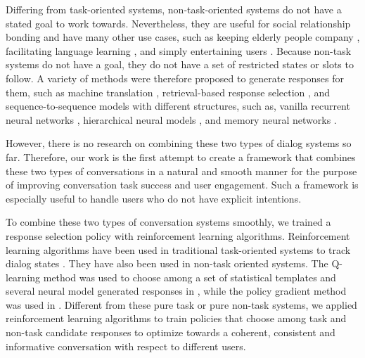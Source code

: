 \documentclass[11pt]{article}
\begin{document}
Differing from task-oriented systems, non-task-oriented systems do not have a stated goal to work towards. Nevertheless, they are useful for social relationship bonding and have many other use cases, such as keeping elderly people company \cite{higashinaka2014towards}, facilitating language learning \cite{jia2008use}, and simply entertaining users \cite{yu2016sigdialeng}. Because non-task systems do not have a goal, they do not have a set of restricted states or slots to follow. A variety of methods were therefore proposed to generate responses for them, such as machine translation \cite{ritter2011data}, retrieval-based response selection \cite{banchs2012iris}, and sequence-to-sequence models with different structures, such as, vanilla recurrent neural networks \cite{google}, hierarchical neural models \cite{serban2015building}, and memory neural networks \cite{dodge2015evaluating}.

However, there is no research on combining these two types of dialog systems so far. Therefore, our work is the first attempt to create a framework that combines these two types of conversations in a natural and smooth manner for the purpose of improving conversation task success and user engagement. Such a framework is especially useful to handle users who do not have explicit intentions.

To combine these two types of conversation systems smoothly, we trained a response selection policy with reinforcement learning algorithms. Reinforcement learning algorithms have been used in traditional task-oriented systems to track dialog states \cite{williams2007partially}. They have also been used in non-task oriented systems. The Q-learning method was used to choose among a set of statistical templates and several neural model generated responses in \cite{yu2016sigdial}, while the policy gradient method was used in \cite{li2016deep}. Different from these pure task or pure non-task systems, we applied reinforcement learning algorithms to train policies that choose among task and non-task candidate responses to optimize towards a coherent, consistent and informative conversation with respect to different users. 
\end{document}
